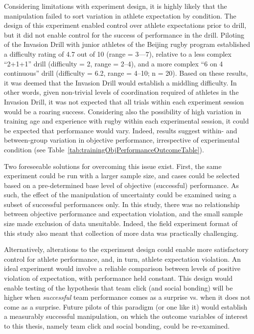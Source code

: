 Considering limitations with experiment design, it is highly likely that the manipulation failed to sort variation in athlete expectation by condition.  The design of this experiment enabled control over athlete expectations prior to drill, but it did not enable control for the success of performance in the drill.  Piloting of the Invasion Drill with junior athletes of the Beijing rugby program established a difficulty rating of 4.7 out of 10 (range = 3—7), relative to a less complex ``2+1+1'' drill (difficulty = 2, range = 2–4), and a more complex ``6 on 4 continuous'' drill (difficulty = 6.2, range = 4–10; n = 20).  Based on these results, it was deemed that the Invasion Drill would establish a middling difficulty.  In other words, given non-trivial levels of coordination required of athletes in the Invasion Drill, it was not expected that all trials within each experiment session would be a roaring success.  Considering also the possibility of high variation in training age and experience with rugby within each experimental session, it could be expected that performance would vary.  Indeed, results suggest within- and between-group variation in objective performance, irrespective of experimental condition (see Table~\ref{tab:trainingObjPerformanceOutcomeTable}).

Two foreseeable solutions for overcoming this issue exist.  First, the same experiment could be run with a larger sample size, and cases could be selected based on a pre-determined base level of objective (successful) performance.  As such, the effect of the manipulation of uncertainty could be examined using a subset of successful performances only.  In this study, there was no relationship between objective performance and expectation violation, and the small sample size made exclusion of data unsuitable.  Indeed, the field experiment format of this study also meant that collection of more data was practically challenging.

Alternatively, alterations to the experiment design could enable more satisfactory control for athlete performance, and, in turn, athlete expectation violation.  An ideal experiment would involve a reliable comparison between levels of positive violation of expectation, with performance held constant.  This design would enable testing of the hypothesis that team click (and social bonding) will be higher when \textit{successful} team performance comes as a surprise vs. when it does not come as a surprise.  Future pilots of this paradigm (or one like it) would establish a measurably successful manipulation, on which the outcome variables of interest to this thesis, namely team click and social bonding, could be re-examined.

